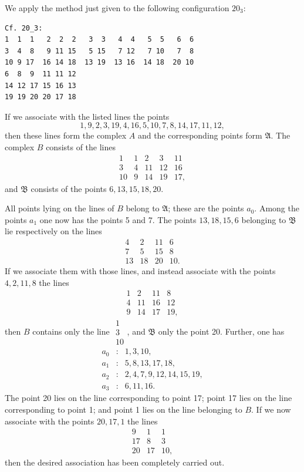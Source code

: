 \documentclass[11pt]{article}
\begin{document}
We apply the method just given to the following configuration $20_3$:
\small
\begin{verbatim}
Cf. 20_3:
1  1  1   2  2  2   3  3   4  4   5  5   6  6
3  4  8   9 11 15   5 15   7 12   7 10   7  8
10 9 17  16 14 18  13 19  13 16  14 18  20 10
6  8  9  11 11 12
14 12 17 15 16 13
19 19 20 20 17 18
\end{verbatim}
\normalsize
If we associate with the listed lines the points
\[
1,9,2,3,19,4,16,5,10,7,8,14,17,11,12,
\]
then these lines form the complex $A$ and the corresponding points form $\mathfrak A$. The complex $B$ consists of the lines
\[
\begin{array}{ccccc}
1&1&2&3&11\\
3&4&11&12&16\\
10&9&14&19&17,
\end{array}
\]
and $\mathfrak B$ consists of the points $6,13,15,18,20$.

All points lying on the lines of $B$ belong to $\mathfrak A$; these are the points $a_0$. Among the points $a_1$ one now has the points 5 and 7. The points $13,18,15,6$ belonging to $\mathfrak B$ lie respectively on the lines
\[
\begin{array}{cccc}
4&2&11&6\\
7&5&15&8\\
13&18&20&10.
\end{array}
\]
If we associate them with those lines, and instead associate with the points $4,2,11,8$ the lines
\[
\begin{array}{cccc}
1&2&11&8\\
4&11&16&12\\
9&14&17&19,
\end{array}
\]
then $B$ contains only the line $\begin{array}{c}1\\3\\10\end{array}$, and $\mathfrak B$ only the point 20. Further, one has
\[
\begin{array}{rcl}
 a_0&:&1,3,10,\\
 a_1&:&5,8,13,17,18,\\
 a_2&:&2,4,7,9,12,14,15,19,\\
 a_3&:&6,11,16.
\end{array}
\]
The point 20 lies on the line corresponding to point 17; point 17 lies on the line corresponding to point 1; and point 1 lies on the line belonging to $B$. If we now associate with the points $20,17,1$ the lines
\[
\begin{array}{ccc}
9&1&1\\
17&8&3\\
20&17&10,
\end{array}
\]
then the desired association has been completely carried out.
\end{document}
